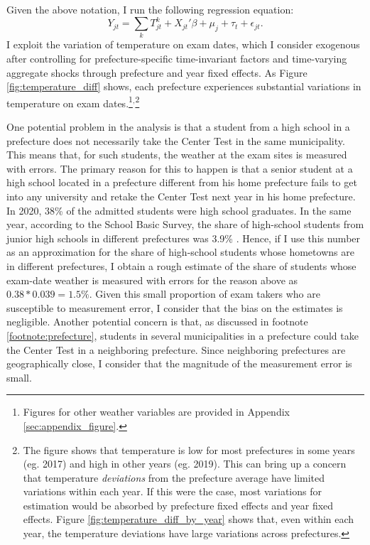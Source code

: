\documentclass[12pt,letterpaper]{article}
\begin{document}
Given the above notation, I run the following regression equation:
\begin{equation*}
  Y_{jt} = \sum_k T_{jt}^k + X_{jt}' \beta + \mu_j + \tau_t + \epsilon_{jt}.
\end{equation*}
I exploit the variation of temperature on exam dates, which I consider exogenous after controlling for prefecture-specific time-invariant factors and time-varying aggregate shocks through prefecture and year fixed effects.
As Figure \ref{fig:temperature_diff} shows, each prefecture experiences substantial variations in temperature on exam dates.\footnote{
  Figures for other weather variables are provided in Appendix \ref{sec:appendix_figure}.
}$^,$\footnote{
  The figure shows that temperature is low for most prefectures in some years (eg. 2017) and high in other years (eg. 2019).
  This can bring up a concern that temperature \textit{deviations} from the prefecture average have limited variations within each year.
  If this were the case, most variations for estimation would be absorbed by prefecture fixed effects and year fixed effects.
  Figure \ref{fig:temperature_diff_by_year} shows that, even within each year, the temperature deviations have large variations across prefectures.
}

One potential problem in the analysis is that a student from a high school in a prefecture does not necessarily take the Center Test in the same municipality.
This means that, for such students, the weather at the exam sites is measured with errors.
The primary reason for this to happen is that a senior student at a high school located in a prefecture different from his home prefecture fails to get into any university and retake the Center Test next year in his home prefecture.
In 2020, 38\% of the admitted students were high school graduates.
In the same year, according to the School Basic Survey, the share of high-school students from junior high schools in different prefectures was 3.9\% \citep{eStat}.
Hence, if I use this number as an approximation for the share of high-school students whose hometowns are in different prefectures, I obtain a rough estimate of the share of students whose exam-date weather is measured with errors for the reason above as $0.38 * 0.039 = 1.5\%$. 
Given this small proportion of exam takers who are susceptible to measurement error, I consider that the bias on the estimates is negligible.
Another potential concern is that, as discussed in footnote \ref{footnote:prefecture}, students in several municipalities in a prefecture could take the Center Test in a neighboring prefecture.
Since neighboring prefectures are geographically close, I consider that the magnitude of the measurement error is small.
\end{document}
